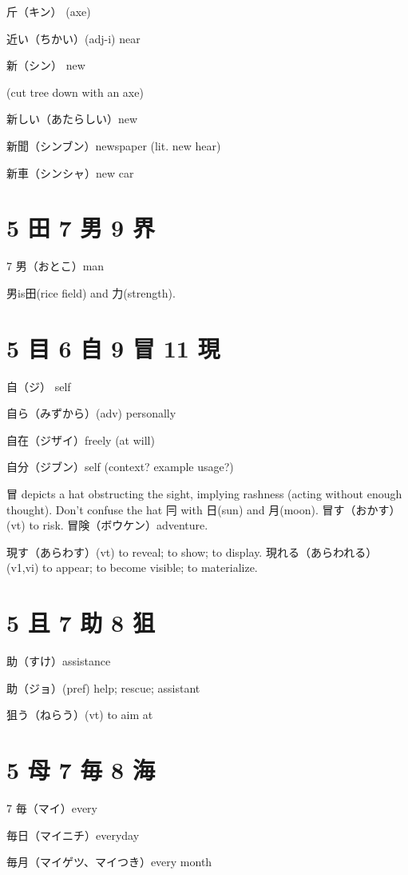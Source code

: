 斤（キン） (axe)

近い（ちかい）(adj-i) near

新（シン） new

(cut tree down with an axe)

新しい（あたらしい）new

新聞（シンブン）newspaper (lit. new hear)

新車（シンシャ）new car

\section{5 田 7 男 9 界}

7 男（おとこ）man

男is田(rice field) and 力(strength).

\section{5 目 6 自 9 冒 11 現}

自（ジ） self

自ら（みずから）(adv) personally

自在（ジザイ）freely (at will)

自分（ジブン）self (context? example usage?)

冒 depicts a hat obstructing the sight, implying rashness
(acting without enough thought).
Don't confuse the hat 冃 with 日(sun) and 月(moon).
冒す（おかす）(vt) to risk.
冒険（ボウケン）adventure.

現す（あらわす）(vt) to reveal; to show; to display.
現れる（あらわれる）(v1,vi) to appear; to become visible; to materialize.

\section{5 且 7 助 8 狙}

助（すけ）assistance

助（ジョ）(pref) help; rescue; assistant

狙う（ねらう）(vt) to aim at

\section{5 母 7 毎 8 海}

7 毎（マイ）every

毎日（マイニチ）everyday

毎月（マイゲツ、マイつき）every month

